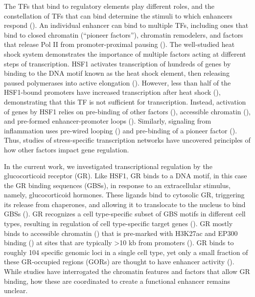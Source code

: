 \documentclass{article}
\begin{document}
{The TFs that bind to regulatory elements play different roles, and the constellation of TFs that can bind determine the stimuli to which enhancers respond (\cite{weikum_glucocorticoid_2017, vihervaara_molecular_2018}). An individual enhancer can bind to multiple TFs, including ones that bind to closed chromatin (“pioneer factors”), chromatin remodelers, and factors that release Pol II from promoter-proximal pausing (\cite{andersson_determinants_2020}). The well-studied heat shock system demonstrates the importance of multiple factors acting at different steps of transcription. HSF1 activates transcription of hundreds of genes by binding to the DNA motif known as the heat shock element, then releasing paused polymerases into active elongation (\cite{bunch_trim28_2014, mahat_mammalian_2016}).  However, less than half of the HSF1-bound promoters have increased transcription after heat shock (\cite{mahat_mammalian_2016}), demonstrating that this TF is not sufficient for transcription. Instead, activation of genes by HSF1 relies on pre-binding of other factors (\cite{duarte_transcription_2016}), accessible chromatin (\cite{vihervaara_transcriptional_2017}), and pre-formed enhancer-promoter loops (\cite{ray_chromatin_2019}). Similarly, signaling from inflammation uses pre-wired looping (\cite{jin_high-resolution_2013}) and pre-binding of a pioneer factor (\cite{escoubet-lozach_mechanisms_2011}). Thus, studies of stress-specific transcription networks have uncovered principles of how other factors impact gene regulation.

In the current work, we investigated transcriptional regulation by the glucocorticoid receptor (GR). Like HSF1, GR binds to a DNA motif, in this case the GR binding sequences (GBSs), in response to an extracellular stimulus, namely, glucocorticoid hormones. These ligands bind to cytosolic GR, triggering its release from chaperones, and allowing it to translocate to the nucleus to bind GBSs (\cite{miranda_complex_2013, meijsing_mechanisms_2015, weikum_glucocorticoid_2017}). GR recognizes a cell type-specific subset of GBS motifs in different cell types, resulting in regulation of cell type-specific target genes (\cite{so_determinants_2007, john_chromatin_2011, love_role_2017, thormann_genomic_2018, franco_immune_2019}). GR mostly binds to accessible chromatin (\cite{john_chromatin_2011, grontved_cebp_2013, love_role_2017}) that is pre-marked with H3K27ac and EP300 binding (\cite{mcdowell_glucocorticoid_2018}) at sites that are typically >10 kb from promoters (\cite{so_determinants_2007, reddy_genomic_2009}). GR binds to roughly 104 specific genomic loci in a single cell type, yet only a small fraction of these GR-occupied regions (GORs) are thought to have enhancer activity (\cite{vockley_direct_2016}). While studies have interrogated the chromatin features and factors that allow GR binding, how these are coordinated to create a functional enhancer remains unclear.

}
\end{document}
